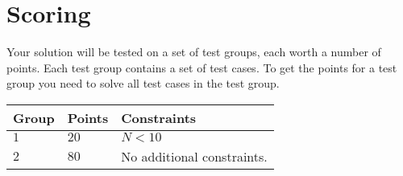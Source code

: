 \section*{Scoring}
Your solution will be tested on a set of test groups, each worth a number of points. Each test group contains
a set of test cases. To get the points for a test group you need to solve all test cases in the test group.

\noindent
\begin{tabular}{| l | l | p{12cm} |}
  \hline
  \textbf{Group} & \textbf{Points} & \textbf{Constraints} \\ \hline
  $1$    & $20$       & $N < 10$ \\ \hline
  $2$    & $80$       & No additional constraints. \\ \hline
\end{tabular}
